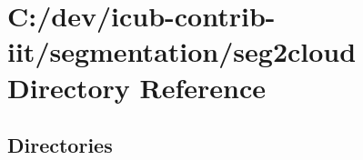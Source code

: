 \section{C\+:/dev/icub-\/contrib-\/iit/segmentation/seg2cloud Directory Reference}
\label{dir_ff5829e7d78767196f3c6c7d46efb88c}
\subsection*{Directories}
\begin{DoxyCompactItemize}
\end{DoxyCompactItemize}
